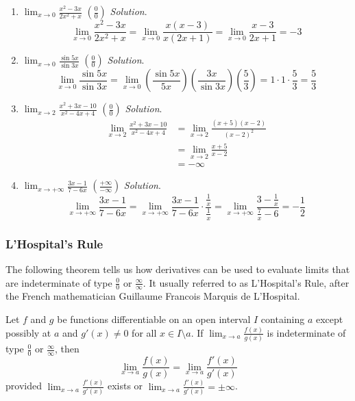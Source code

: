 \documentclass[
  letterpaper,
  DIV=11,
  numbers=noendperiod]{scrartcl}
\theoremstyle{plain}
\theoremstyle{remark}
\begin{document}
\begin{enumerate}
\def\labelenumi{\arabic{enumi}.}
\item
  \(\displaystyle\lim_{x \to 0} \frac{x^2-3x}{2x^2+x}\)
  \(\left(\frac{0}{0}\right)\) \emph{Solution}. \[
  \displaystyle\lim_{x \to 0} \frac{x^2-3x}{2x^2+x}= \displaystyle\lim_{x \to 0} \frac{x(x-3)}{x(2x+1)}=\displaystyle\lim_{x \to 0} \frac{x-3}{2x+1}=-3
  \]
\item
  \(\displaystyle\lim_{x \to 0} \frac{\sin5x}{\sin3x}\)
  \(\left(\frac{0}{0}\right)\) \emph{Solution}. \[
  \displaystyle\lim_{x \to 0} \frac{\sin5x}{\sin3x}=\displaystyle\lim_{x \to 0} \left(\frac{\sin5x}{5x}\right)\left(\frac{3x}{\sin3x}\right)\left(\frac{5}{3}\right)=1\cdot1\cdot\frac{5}{3}=\frac{5}{3}
  \]
\item
  \(\displaystyle\lim_{x \to 2} \frac{x^2+3x-10}{x^2-4x+4}\)
  \(\left(\frac{0}{0}\right)\) \emph{Solution}. \[
  \begin{aligned}
  \displaystyle\lim_{x \to 2} \frac{x^2+3x-10}{x^2-4x+4}&=\displaystyle\lim_{x \to 2}\frac{(x+5)(x-2)}{(x-2)^2}\\&=\displaystyle\lim_{x \to 2}\frac{x+5}{x-2}\\&=-\infty
  \end{aligned}
  \]
\item
  \(\displaystyle\lim_{x \to +\infty}\frac{3x-1}{7-6x}\)
  \(\left(\frac{+\infty}{-\infty}\right)\) \emph{Solution}. \[
  \displaystyle\lim_{x \to +\infty}\frac{3x-1}{7-6x}=\displaystyle\lim_{x \to +\infty}\frac{3x-1}{7-6x}\cdot \frac{\frac{1}{x}}{\frac{1}{x}}=\displaystyle\lim_{x \to +\infty}\frac{3-\frac{1}{x}}{\frac{7}{x}-6}=-\frac{1}{2}
  \]
\end{enumerate}

\hypertarget{htm:lhospitalsrule}{}
\hypertarget{lhospitals-rule}{%
\subsubsection{L'Hospital's Rule}\label{lhospitals-rule}}

The following theorem tells us how derivatives can be used to evaluate
limits that are indeterminate of type \(\frac{0}{0}\) or
\(\frac{\infty}{\infty}\). It usually referred to as L'Hospital's Rule,
after the French mathematician Guillaume Francois Marquis de L'Hospital.

\leavevmode{}%
Let \(f\) and \(g\) be functions differentiable on an open interval
\(I\) containing \(a\) except possibly at \(a\) and \(g'(x)\ne 0\) for
all \(x \in I \setminus {a}\). If
\(\displaystyle\lim_{x \to a}\frac{f(x)}{g(x)}\) is indeterminate of
type \(\frac{0}{0}\) or \(\frac{\infty}{\infty}\), then \[
\displaystyle\lim_{x \to a}\frac{f(x)}{g(x)}=\displaystyle\lim_{x \to a}\frac{f'(x)}{g'(x)}
\] provided \(\displaystyle\lim_{x \to a}\frac{f'(x)}{g'(x)}\) exists or
\(\displaystyle\lim_{x \to a}\frac{f'(x)}{g'(x)}=\pm \infty\).
\end{document}
